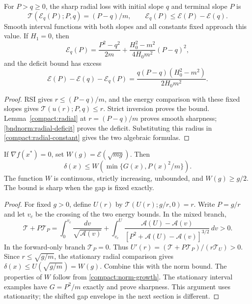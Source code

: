 \begin{proposition}\label{joint:fixed-slope}
For $P>q\ge0$, the sharp radial loss with initial slope $q$ and terminal
slope $P$ is
\begin{equation}\label{joint:fixed-slope-time}
 \mathcal T(\mathcal E_q(P);P,q)=(P-q)/m,
 \qquad \mathcal E_q(P)\le\mathcal E(P)-\mathcal E(q).
\end{equation}
Smooth interval functions with both slopes and all constants fixed
approach this value. If $H_1=0$, then
\begin{equation}\label{joint:fixed-slope-constant}
 \mathcal E_q(P)=\frac{P^2-q^2}{2m}
       +\frac{H_0^2-m^2}{4H_0m^2}(P-q)^2,
\end{equation}
and the deficit bound has excess
\[
 \mathcal E(P)-\mathcal E(q)-\mathcal E_q(P)
 =\frac{q(P-q)(H_0^2-m^2)}{2H_0m^2}.
\]
\end{proposition}
\begin{proof}
RSI gives $r\le(P-q)/m$, and the energy comparison with these fixed
slopes gives $\mathcal T(u(r);P,q)\le r$. Strict inversion proves the
bound. Lemma~\ref{compact:radial} at $r=(P-q)/m$ proves smooth sharpness;
\eqref{bndnorm:radial-deficit} proves the deficit. Substituting this
radius in \eqref{compact:radial-constant} gives the two algebraic formulas.
\end{proof}

\begin{corollary}\label{energy:gap}
If $\nabla f(x^*)=0$, set $W(g)=\mathcal E(\sqrt{mg})$. Then
\begin{equation}\label{energy:gap-certificate}
 \delta(x)\le W\!\left(\min\{G(x),P(x)^2/m\}\right).
\end{equation}
The function $W$ is continuous, strictly increasing, unbounded, and
$W(g)\ge g/2$. The bound is sharp when the gap is fixed exactly.
\end{corollary}
\begin{proof}
For fixed $g>0$, define $U(r)$ by
$\mathcal T(U(r);g/r,0)=r$. Write $P=g/r$ and let $v_c$ be the
crossing of the two energy bounds. In the mixed branch,
\[
 \mathcal T+P\mathcal T_P
 =\int_0^{v_c}\frac{dv}{\sqrt{\mathcal A(v)}}
 +\int_{v_c}^{U}
   \frac{\mathcal A(U)-\mathcal A(v)}
        {[P^2+\mathcal A(U)-\mathcal A(v)]^{3/2}}\,dv>0.
\]
In the forward-only branch $\mathcal T_P=0$. Thus
$U'(r)=(\mathcal T+P\mathcal T_P)/(r\mathcal T_U)>0$.
Since $r\le\sqrt{g/m}$, the stationary radial comparison gives
$\delta(x)\le U(\sqrt{g/m})=W(g)$. Combine this with the norm
bound. The properties of $W$ follow from \eqref{compact:norm-growth}.
The stationary interval examples have $G=P^2/m$ exactly and prove
sharpness. This argument uses stationarity; the shifted gap envelope
in the next section is different.
\end{proof}

